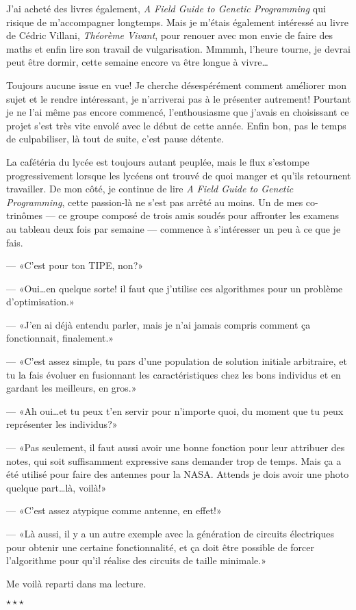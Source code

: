 \documentclass[letterpaper, 12pt]{report} %
\newcommand{\stardelimiter}{{\begin{center}\vspace{0.3cm} $\star \star \star$\vspace{0.25cm}\end{center}}}
\begin{document}
{J'ai acheté des livres également, \textit{A Field Guide to Genetic Programming} qui risique de m'accompagner longtemps.
Mais je m'étais également intéressé au livre de Cédric Villani, \textit{Théorème Vivant}, pour renouer avec mon envie de faire des maths et enfin lire son travail de vulgarisation. 
Mmmmh, l'heure tourne, je devrai peut être dormir, cette semaine encore va être longue à vivre\dots

Toujours aucune issue en vue!
Je cherche désespérément comment améliorer mon sujet et le rendre intéressant, je n'arriverai pas à le présenter autrement!
Pourtant je ne l'ai même pas encore commencé, l'enthousiasme que j'avais en choisissant ce projet s'est très vite envolé avec le début de cette année.
Enfin bon, pas le temps de culpabiliser, là tout de suite, c'est pause détente. 

La cafétéria du lycée est toujours autant peuplée, mais le flux s'estompe progressivement lorsque les lycéens ont trouvé de quoi manger et qu'ils retournent travailler. 
De mon côté, je continue de lire \textit{A Field Guide to Genetic Programming}, cette passion-là ne s'est pas arrêté au moins.
Un de mes co-trinômes --- ce groupe composé de trois amis soudés pour affronter les examens au tableau deux fois par semaine --- commence à s'intéresser un peu à ce que je fais.

--- «C'est pour ton TIPE, non?»

--- «Oui\dots en quelque sorte! il faut que j'utilise ces algorithmes pour un problème d'optimisation.»

--- «J'en ai déjà entendu parler, mais je n'ai jamais compris comment ça fonctionnait, finalement.»

--- «C'est assez simple, tu pars d'une population de solution initiale arbitraire, et tu la fais évoluer en fusionnant les caractéristiques chez les 			bons individus et en gardant les meilleurs, en gros.»

--- «Ah oui\dots et tu peux t'en servir pour n'importe quoi, du moment que tu peux représenter les individus?»

--- «Pas seulement, il faut aussi avoir une bonne fonction pour leur attribuer des notes, qui soit suffisamment expressive sans demander trop de temps. 		Mais ça a été utilisé pour faire des antennes pour la {NASA}. Attends je dois avoir une photo quelque part\dots là, voilà!»

--- «C'est assez atypique comme antenne, en effet!»

--- «Là aussi, il y a un autre exemple avec la génération de circuits électriques pour obtenir une certaine fonctionnalité, et ça doit être possible de 			forcer l'algorithme pour qu'il réalise des circuits de taille minimale.»

Me voilà reparti dans ma lecture.

\stardelimiter{}



}
\end{document}
